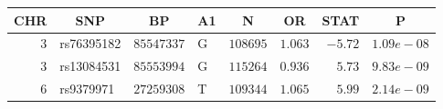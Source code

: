 \begin{center}
\begin{tabular}{rlrlrrrr}
\hline\hline
\multicolumn{1}{c}{CHR}&\multicolumn{1}{c}{SNP}&\multicolumn{1}{c}{BP}&\multicolumn{1}{c}{A1}&\multicolumn{1}{c}{N}&\multicolumn{1}{c}{OR}&\multicolumn{1}{c}{STAT}&\multicolumn{1}{c}{P}\tabularnewline
\hline
$3$ & rs76395182 & $85547337$ & G & $108695$ & $1.063$ & $ -5.72$ & $1.09e-08$\tabularnewline
$3$ & rs13084531 & $85553994$ & G & $115264$ & $0.936$ & $5.73$ & $9.83e-09$\tabularnewline
$6$ & rs9379971  & $27259308$ & T & $109344$ & $1.065$ & $ 5.99$ & $2.14e-09$\tabularnewline
\hline
\end{tabular}\end{center}
